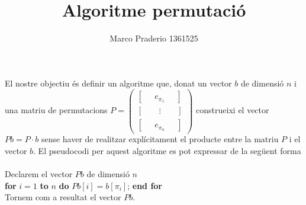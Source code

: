 \documentclass[a4paper,10pt]{article}
\title{Algoritme permutació}
\author{Marco Praderio 1361525}
\date{}
\renewcommand{\*}{\cdot}
\begin{document}
\maketitle
El nostre objectiu és definir un algoritme que, donat un vector $b$ de dimensió $n$ i una matriu de permutacions $P=\begin{pmatrix}
                                                                                                     [\phantom{esp}e_{\pi_1}\phantom{esp}]\\
                                                                                                     [\phantom{espa}\vdots\phantom{espa}]\\
                                                                                                     [\phantom{esp}e_{\pi_n}\phantom{esp}]
                                                                                                    \end{pmatrix}$ construeixi el vector $Pb=P\*b$ sense haver de
realitzar explícitament el producte entre la matriu $P$ i el vector $b$.
El pseudocodi per aquest algoritme es pot expressar de la següent forma
\paragraph*{}
Declarem el vector $Pb$ de dimensió $n$\\
\phantom{espai} \textbf{for} $i=1$ \textbf{to} $n$ \textbf{do} $Pb[i]=b[\pi_i]$; \textbf{end for}\\
Tornem com a resultat el vector $Pb$.
\end{document}
